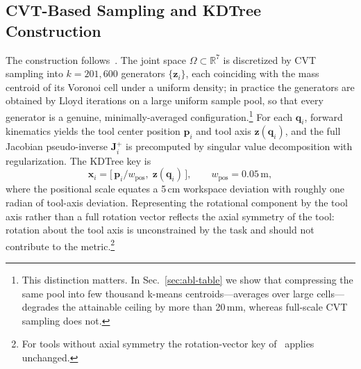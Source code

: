 \documentclass[journal]{IEEEtran}
\begin{document}
\subsection{CVT-Based Sampling and KDTree Construction}
\label{sec:cvt}
The construction follows~\cite{yuan2026iksel}. The joint space
$\Omega\subset\mathbb{R}^{7}$ is discretized by CVT sampling into
$k{=}201{,}600$ generators $\{\mathbf{z}_i\}$, each coinciding with the
mass centroid of its Voronoi cell under a uniform density; in practice
the generators are obtained by Lloyd iterations on a large uniform
sample pool, so that every generator is a genuine, minimally-averaged
configuration.\footnote{This distinction matters. In
Sec.~\ref{sec:abl-table} we show that compressing the same pool into few
thousand k-means centroids---averages over large cells---degrades the
attainable ceiling by more than 20\,mm, whereas full-scale CVT sampling
does not.} For each $\mathbf{q}_i$, forward kinematics yields the tool
center position $\mathbf{p}_i$ and tool axis $\mathbf{z}(\mathbf{q}_i)$,
and the full Jacobian pseudo-inverse $\mathbf{J}^{+}_i$ is precomputed by
singular value decomposition with regularization. The KDTree key is
\begin{equation}
\mathbf{x}_i=\big[\,\mathbf{p}_i/w_{\mathrm{pos}},\;
\mathbf{z}(\mathbf{q}_i)\,\big],\qquad w_{\mathrm{pos}}=0.05\,
\mathrm{m},
\label{eq:key}
\end{equation}
where the positional scale equates a 5\,cm workspace deviation with
roughly one radian of tool-axis deviation. Representing the rotational
component by the tool axis rather than a full rotation vector reflects
the axial symmetry of the tool: rotation about the tool axis is
unconstrained by the task and should not contribute to the
metric.\footnote{For tools without axial symmetry the rotation-vector
key of~\cite{yuan2026iksel} applies unchanged.}
\end{document}
